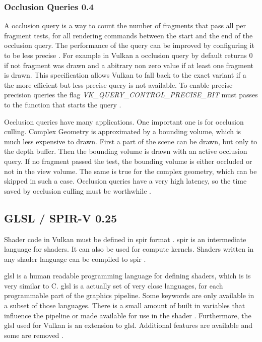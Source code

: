 \subsubsection{Occlusion Queries 0.4}
A occlusion query is a way to count the number of fragments that pass all per fragment tests, for all rendering commands between the start and the end of the occlusion query. The performance of the query can be improved by configuring it to be less precise \cite{akine:2018:realtime}. For example in Vulkan a occlusion query by default returns 0 if not fragment was drawn and a abitrary non zero value if at least one fragment is drawn. This specification allows Vulkan to fall back to the exact variant if a the more efficient but less precise query is not available. To enable precise precision queries the flag \textit{VK\_QUERY\_CONTROL\_PRECISE\_BIT} must passes to the function that starts the query \cite{khronos:vulkan:spec1.1}.

Occlusion queries have many applications. One important one is for occlusion culling. Complex Geometry is approximated by a bounding volume, which is much less expensive to drawn. First a part of the scene can be drawn, but only to the depth buffer. Then the bounding volume is drawn with an active occlusion query. If no fragment passed the test, the bounding volume is either occluded or not in the view volume. The same is true for the complex geometry, which can be skipped in such a case. Occlusion queries have a very high latency, so the time saved by occlusion culling must be worthwhile \cite{akine:2018:realtime, sellers:vulkanprogramming}.


\subsection{GLSL / SPIR-V 0.25}

Shader code in Vulkan must be defined in \gls{spir} format \cite{khronos:vulkan:spec1.1}. \Gls{spir} is an intermediate language for shaders. It can also be used for compute kernels. Shaders written in any shader language can be compiled to \gls{spir} \cite{kessenich:2018:spir}.

\Gls{glsl} is a human readable programming language for defining shaders, which is is very similar to C. \Gls{glsl} is a actually set of very close languages, for each programmable part of the graphics pipeline. Some keywords are only available in a subset of those languages. There is a small amount of built in variables that influence the pipeline or made available for use in the shader \cite{khronos:glsl4.60:spec}. Furthermore, the \gls{glsl} used for Vulkan is an extension to \gls{glsl}. Additional features are available and some are removed \cite{khronos:vulkan:glsl}.

